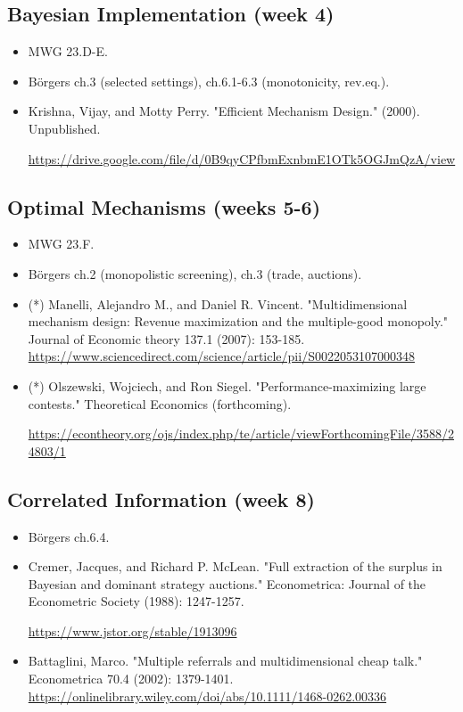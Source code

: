 \documentclass{article}
\begin{document}
\subsection{Bayesian Implementation (week 4)}
\begin{itemize}
	\item MWG 23.D-E.
	\item B{\"o}rgers ch.3 (selected settings), ch.6.1-6.3 (monotonicity, rev.eq.).
	\item Krishna, Vijay, and Motty Perry. "Efficient Mechanism Design." (2000). Unpublished.
	
	\url{https://drive.google.com/file/d/0B9qyCPfbmExnbmE1OTk5OGJmQzA/view}
\end{itemize}

\subsection{Optimal Mechanisms (weeks 5-6)}
\begin{itemize}
	\item MWG 23.F.
	\item B{\"o}rgers ch.2 (monopolistic screening), ch.3 (trade, auctions).
	\item (*) Manelli, Alejandro M., and Daniel R. Vincent. "Multidimensional mechanism design: Revenue maximization and the multiple-good monopoly." Journal of Economic theory 137.1 (2007): 153-185. \url{https://www.sciencedirect.com/science/article/pii/S0022053107000348}
	\item (*) Olszewski, Wojciech, and Ron Siegel. "Performance-maximizing large contests." Theoretical Economics (forthcoming).
	
	\url{https://econtheory.org/ojs/index.php/te/article/viewForthcomingFile/3588/24803/1}
\end{itemize}

\subsection{Correlated Information (week 8)}
\begin{itemize}
	\item B{\"o}rgers ch.6.4.
	\item Cremer, Jacques, and Richard P. McLean. "Full extraction of the surplus in Bayesian and dominant strategy auctions." Econometrica: Journal of the Econometric Society (1988): 1247-1257.
	
	\url{https://www.jstor.org/stable/1913096}
	\item Battaglini, Marco. "Multiple referrals and multidimensional cheap talk." Econometrica 70.4 (2002): 1379-1401. \url{https://onlinelibrary.wiley.com/doi/abs/10.1111/1468-0262.00336}
\end{itemize}
\end{document}
